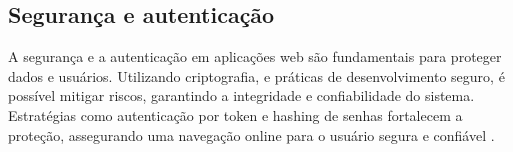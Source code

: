 
\subsection{Segurança e autenticação}
A segurança e a autenticação em aplicações web são fundamentais para proteger dados e usuários. Utilizando criptografia,  e práticas de desenvolvimento seguro, é possível mitigar riscos, garantindo a integridade e confiabilidade do sistema. Estratégias como autenticação por token e hashing de senhas fortalecem a proteção, assegurando uma navegação online para o usuário segura e confiável \cite{segurancaeauth}.

